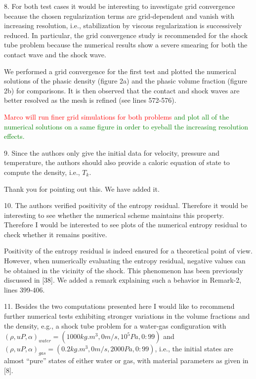 \documentclass{article}
\newcommand{\tcr}[1]{\textcolor{red}{#1}}
\newcommand{\tcg}[1]{\textcolor{green}{#1}}
\begin{document}
{\color{blue}
8. For both test cases it would be interesting to investigate grid convergence because the
chosen regularization terms are grid-dependent and vanish with increasing resolution,
i.e., stabilization by viscous regularization is successively reduced. In particular, the
grid convergence study is recommended for the shock tube problem because the
numerical results show a severe smearing for both the contact wave and the shock
wave.}


We performed a grid convergence for the first test and plotted the numerical solutions of the phasic density (figure 2a) and
the phasic volume fraction (figure 2b) for comparisons. It is then observed that the contact and shock waves are better resolved as 
the mesh is refined (see lines 572-576). 

\tcr{Marco will run finer grid simulations for both problems} \tcg{ and plot all of the numerical solutions on a same
figure in order to eyeball the increasing resolution effects.}
\bigskip


{\color{blue}
9. Since the authors only give the initial data for velocity, pressure and temperature,
the authors should also provide a caloric equation of state to compute the density,
i.e., $T_k$.}

Thank you for pointing out this. We have added it.
\bigskip


{\color{blue}
10. The authors verified positivity of the entropy residual. Therefore it would be 
interesting to see whether the numerical scheme maintains this property. Therefore I
would be interested to see plots of the numerical entropy residual to check whether
it remains positive.}

Positivity of the entropy residual is indeed ensured for a theoretical point of view. 
However, when numerically evaluating the entropy residual, negative values can be obtained in 
the vicinity of the shock. This phenomenon has been previously discussed in [38]. 
We added a remark explaining such a behavior in Remark-2, lines 399-406.

\bigskip


{\color{blue}
11. Besides the two computations presented here I would like to recommend further
numerical tests exhibiting stronger variations in the volume fractions and the density, 
e.g., a shock tube problem for a water-gas configuration with 
$(\rho, u P, \alpha)_{water} = (1000kg.m^3, 0m/s, 10^5Pa, 0:99)$ and 
$(\rho, u P, \alpha)_{gas}   = (0.2 kg.m^3, 0m/s, 2000Pa, 0:99)$,
i.e., the initial states are almost ``pure'' states of either water or gas, with material
parameters as given in [8].}
\end{document}

